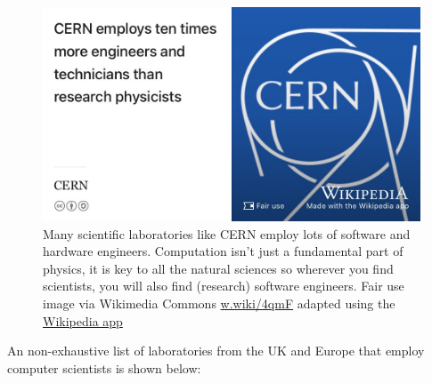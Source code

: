 \documentclass[
]{book}
\begin{document}
\begin{figure}

{\centering \includegraphics[width=1\linewidth]{images/cern-engineering} 

}

\caption{Many scientific laboratories like CERN employ lots of software and hardware engineers. Computation isn't just a fundamental part of physics, it is key to all the natural sciences so wherever you find scientists, you will also find (research) software engineers. Fair use image via Wikimedia Commons \href{https://w.wiki/4qmF}{w.wiki/4qmF} adapted using the \href{https://apps.apple.com/us/app/wikipedia/id324715238}{Wikipedia app}}\label{fig:cern-fig}
\end{figure}



An non-exhaustive list of laboratories from the UK and Europe that employ computer scientists is shown below:
\end{document}
